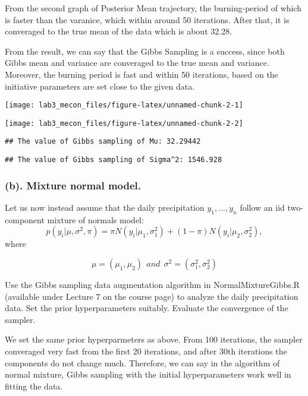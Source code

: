 \documentclass[]{article}
\begin{document}
From the second graph of Posterior Mean trajectory, the burning-period
of which is faster than the varanice, which within around 50 iterations.
After that, it is converaged to the true mean of the data which is about
32.28.

From the result, we can say that the Gibbs Sampling is a success, since
both Gibbs mean and variance are converaged to the true mean and
variance. Moreover, the burning period is fast and within 50 iterations,
based on the initiative parameters are set close to the given data.

\begin{center}\texttt{[image: lab3\_mecon\_files/figure-latex/unnamed-chunk-2-1]} \end{center}

\begin{center}\texttt{[image: lab3\_mecon\_files/figure-latex/unnamed-chunk-2-2]} \end{center}

\begin{verbatim}
## The value of Gibbs sampling of Mu: 32.29442
\end{verbatim}

\begin{verbatim}
## The value of Gibbs sampling of Sigma^2: 1546.928
\end{verbatim}

\hypertarget{b.-mixture-normal-model.}{%
\subsubsection{(b). Mixture normal
model.}\label{b.-mixture-normal-model.}}

Let us now instead assume that the daily precipitation
\({y_1 , ..., y_n}\) follow an iid two-component mixture of normals
model:
\[p(y_i|\mu,\sigma^2, \pi) = \pi N(y_i|\mu_1, \sigma_1^2) +(1-\pi)N(y_i|\mu_2,\sigma_2^2),\]
where

\[\mu = (\mu_1, \mu_2) \ \ and\ \ \sigma^2 = (\sigma_1^2, \sigma_2^2)\]

Use the Gibbs sampling data augmentation algorithm in
NormalMixtureGibbs.R (available under Lecture 7 on the course page) to
analyze the daily precipitation data. Set the prior hyperparameters
suitably. Evaluate the convergence of the sampler.

We set the same prior hyperparmeters as above. From 100 iterations, the
sampler converaged very fast from the first 20 iterations, and after
30th iterations the components do not change much. Therefore, we can say
in the algorithm of normal mixture, Gibbs sampling with the initial
hyperparameters work well in fitting the data.
\end{document}
